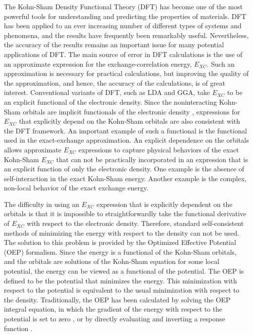 \documentclass{article}
\begin{document}
The Kohn-Sham Density Functional Theory (DFT) \cite{KohnSham:65} has become one of the
most powerful tools for understanding and predicting the properties of materials.  DFT has
been applied to an ever increasing number of different types of systems and
phenomena, and the results have frequently been remarkably useful.  Nevertheless,
the accuracy of the results remains an important issue for many potential
applications of DFT.  The main source of error in DFT calculations is the use
of an approximate expression for the exchange-correlation energy, $E_{XC}$.
Such an approximation is necessary for practical calculations, but improving
the quality of the approximation, and hence, the accuracy of the calculations,
is of great interest.  Conventional variants of DFT, such as LDA and GGA, take
$E_{XC}$ to be an explicit functional of the electronic density.  Since the
noninteracting Kohn-Sham orbitals are implicit functionals of the electronic
density \cite{HohenbergKohn:64},  expressions for $E_{XC}$ that explicitly
depend on the Kohn-Sham orbitals are also consistent with the DFT framework.
An important example of such a functional is the functional used in the exact-exchange
approximation\cite{TalmanShadwick:76, SahniGruenebaumPerdew:82,EngelVosko:93,GorlingLevy:94,
Kotani:95,StadeleMajewskiVoglGorling:97,Gorling99}.  An explicit dependence
on the orbitals allows approximate $E_{XC}$ expressions to capture physical
behaviors of the exact Kohn-Sham $E_{XC}$ that can not be practically incorporated
in an expression that is an explicit function of only the electronic density.  One
example is the absence of self-interaction in the exact Kohn-Sham energy.
Another example is the complex, non-local behavior of the exact exchange energy.

The difficulty in using an $E_{XC}$ expression that is explicitly dependent on
the orbitals is that it is impossible to straightforwardly take the functional
derivative of $E_{XC}$ with respect to the electronic density.  Therefore,
standard self-consistent methods of minimizing the energy with respect to the
density can not be used.  The solution to this problem is provided by the
Optimized Effective Potential (OEP) formalism.  Since the energy is a functional
of the Kohn-Sham orbitals, and the orbitals are solutions of the Kohn-Sham
equation for some local potential, the energy can be viewed as a functional
of the potential.  The OEP is defined to be the potential that minimizes
the energy.  This minimization with respect to the potential is equivalent
to the usual minimization with respect to the density.  Traditionally, the OEP
has been calculated by solving the OEP integral equation, in which the gradient
of the energy with respect to the potential is set to zero \cite{TalmanShadwick:76,
SahniGruenebaumPerdew:82,EngelVosko:93,Kotani:95},
or by directly evaluating and inverting a response function \cite{GorlingLevy:94,
StadeleMajewskiVoglGorling:97,Gorling99}.
\end{document}
